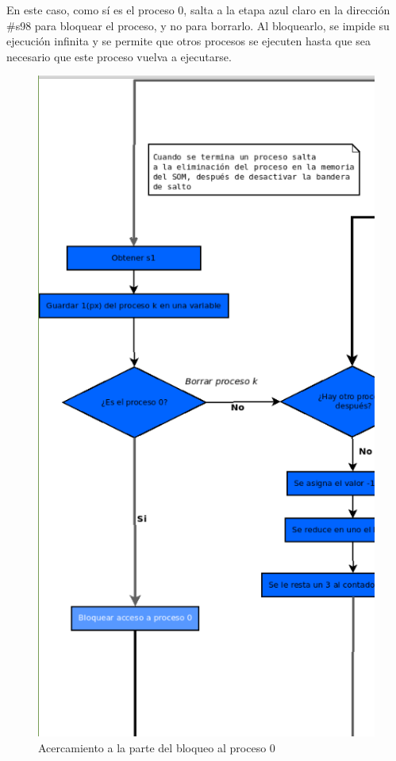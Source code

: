 \documentclass[letterpaper,12pt,oneside]{book}
\begin{document}
        En este caso, como sí es el proceso 0, salta a la etapa azul claro en la dirección \#s98 para bloquear el proceso, y no 
		para borrarlo. Al bloquearlo, se impide su ejecución infinita y se permite que otros procesos se ejecuten hasta que sea necesario que este 
		proceso vuelva a ejecutarse.

        \begin{figure}[h]		
			\centering
			\includegraphics[scale=0.42]{media/CARDIACC/diagBloquearProceso.png}
			\caption{ Acercamiento a la parte del bloqueo al proceso 0}
			\label{fig:diagBloqP0}
		\end{figure}
  
\end{document}
